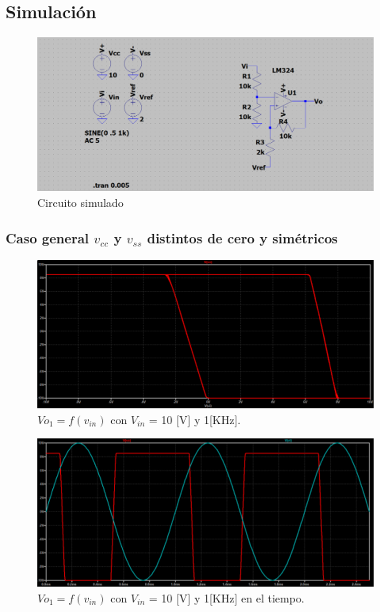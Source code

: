 \subsection{Simulación}
\begin{figure}[H]
	\centering
	\includegraphics[width=1\textwidth]{figuras/Circuito4.png}
	\caption{Circuito simulado}
\end{figure}
\subsubsection{Caso general $v_{cc}$ y $v_{ss}$ distintos de cero y simétricos}
\begin{figure}[H]
	\centering
	\includegraphics[width=1\textwidth]{figuras/caso_gral_histeresis.png}
	\caption{$Vo_1= f(v_{in})$ con $V_{in}$ = 10 [V] y 1[KHz].}
\end{figure}
\begin{figure}[H]
	\centering
	\includegraphics[width=1\textwidth]{figuras/caso_gral_histeresis_time.png}
	\caption{$Vo_1= f(v_{in})$ con $V_{in}$ = 10 [V] y 1[KHz] en el tiempo.}
\end{figure}

